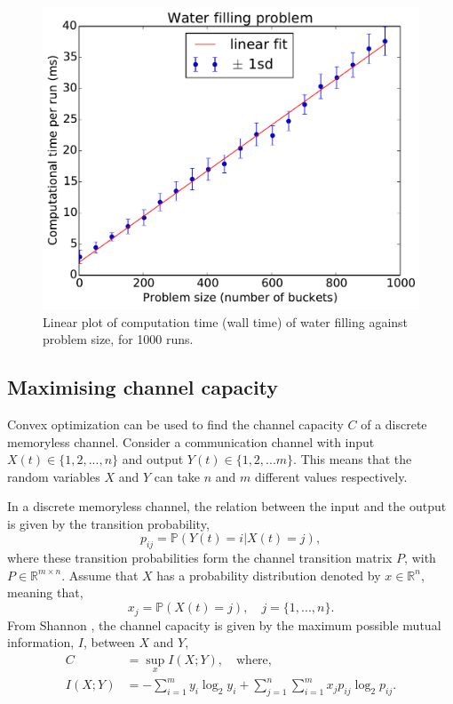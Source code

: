 \documentclass[twocolumn,secnumarabic,amssymb, nobibnotes, aps, prl,superscriptaddress]{revtex4-1}
\begin{document}
\begin{figure}
\includegraphics[width=0.9\linewidth]{water_filling_1000runs_1000buckets.pdf}
\caption{\label{fig:waterfillingcomputcomplex}Linear plot of computation time (wall time) of water filling against problem size, for 1000 runs.}
\end{figure}

\subsection{Maximising channel capacity}

Convex optimization can be used to find the channel capacity $C$ of a discrete memoryless channel. Consider a communication channel with input $X(t)\in\{1,2,...,n\}$ and output $Y(t)\in\{1,2,...m\}$. This means that the random variables $X$ and $Y$ can take $n$ and $m$ different values respectively.

In a discrete memoryless channel, the relation between the input and the output is given by the transition probability,
\begin{equation}
p_{ij} = \mathbb{P}(Y(t)=i|X(t)=j),
\end{equation} where these transition probabilities form the channel transition matrix $P$, with $P \in \mathbb{R}^{m\times n}$.  Assume that $X$ has a probability distribution denoted by $x\in\mathbb{R}^n$, meaning that,
\begin{equation}
x_j = \mathbb{P}(X(t) = j), \quad j=\{1,...,n\}.
\end{equation}
From Shannon \cite{shannon1949}, the channel capacity is given by the maximum possible mutual information, $I$, between $X$ and $Y$,
\begin{align}
C &= \sup_x I(X;Y), \quad \text{where},\\
I(X;Y) &= -\sum_{i=1}^{m}y_i\log_2 y_i+\sum_{j=1}^{n}\sum_{i=1}^{m}x_j p_{ij}\log_2 p_{ij}.
\end{align}
\end{document}
